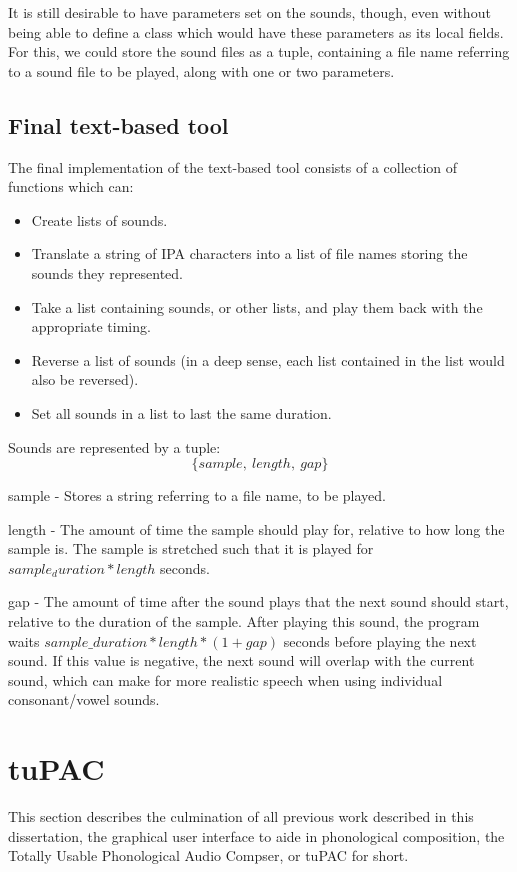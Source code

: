 \documentclass[12pt,a4paper,twoside,openright]{report}
\begin{document}
It is still desirable to have parameters set on the sounds, though, even without being able to define a class which would have these parameters as its local fields. For this, we could store the sound files as a tuple, containing a file name referring to a sound file to be played, along with one or two parameters.

\subsection{Final text-based tool}
The final implementation of the text-based tool consists of a collection of functions which can:
\begin{itemize}
    \item Create lists of sounds.
    \item Translate a string of IPA characters into a list of file names storing the sounds they represented.
    \item Take a list containing sounds, or other lists, and play them back with the appropriate timing.
    \item Reverse a list of sounds (in a deep sense, each list contained in the list would also be reversed).
    \item Set all sounds in a list to last the same duration.
\end{itemize}

Sounds are represented by a tuple:
\begin{equation*}
    \{sample,\ length,\ gap\}
\end{equation*}

sample - Stores a string referring to a file name, to be played.

length - The amount of time the sample should play for, relative to how long the sample is. The sample is stretched such that it is played for $sample_duration * length$ seconds.

gap - The amount of time after the sound plays that the next sound should start, relative to the duration of the sample. After playing this sound, the program waits $sample\_duration * length * (1 + gap)$ seconds before playing the next sound. If this value is negative, the next sound will overlap with the current sound, which can make for more realistic speech when using individual consonant/vowel sounds.
\section{tuPAC}

This section describes the culmination of all previous work described in this dissertation, the graphical user interface to aide in phonological composition, the Totally Usable Phonological Audio Compser, or tuPAC for short.
\end{document}
